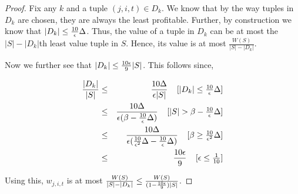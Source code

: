 \begin{proof}
Fix any $k$ and a tuple $(j,i,t) \in D_k$.  We know that by the way tuples in $D_k$ are chosen, they are always the least profitable.  Further, by construction we know that $|D_k| \leq \frac{10}{\epsilon}\Delta$.  Thus, the value of a tuple in $D_k$ can be at most the $|S| - |D_k|$th least value tuple in $S$.  Hence, its value is at most $\frac{W(S)}{|S|-|D_k|} $.

Now we further see that $|D_k| \leq  \frac{ 10\epsilon }{9}  |S|$.  This follows since,   

\begin{eqnarray*}
 \frac{|D_k|}{|S|} &\leq& \frac{ 10\Delta}{\epsilon |S|} \;\;\;\; \mbox{[$|D_k| \leq \frac{10}{\epsilon}\Delta$]}\\
 &\leq&  \frac{ 10\Delta}{\epsilon (\beta - \frac{10}{\epsilon} \Delta)}  \;\;\;\; \mbox{[$|S| > \beta - \frac{10}{\epsilon} \Delta$]}\\
  &\leq&  \frac{ 10\Delta}{\epsilon (\frac{10}{\epsilon^2}\Delta - \frac{10}{\epsilon} \Delta)}  \;\;\;\; \mbox{[$\beta \geq \frac{10}{\epsilon^2}\Delta$]}\\
    &\leq&  \frac{ 10\epsilon }{9}    \;\;\;\; \mbox{[$\epsilon \leq \frac{1}{10}$]}
\end{eqnarray*}

Using this, $w_{j,i,t}$ is at most $\frac{W(S)}{|S|-|D_k|} \leq \frac{W(S)}{(1-\frac{10\epsilon}{9})|S|}$. 






\end{proof}


